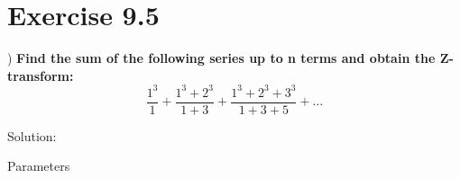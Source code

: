 \documentclass[journal,12pt,twocolumn]{article}
\begin{document}


\vspace{3cm}

\title{}
\author{EE23BTECH11217 - Prajwal M$^{*}$
}
\maketitle
\newpage
\bigskip

\renewcommand{\thefigure}{\theenumi}
\renewcommand{\thetable}{\theenumi}

\section*{Exercise 9.5}
) \hspace{2pt} \textbf{Find the sum of the following series up to n terms and obtain the Z-transform:}
$$ 
\frac{1^3}{1} + \frac{1^3 + 2^3}{1 + 3} + \frac{1^3 + 2^3 + 3^3}{1 + 3 + 5} + \ldots$$

\noindent Solution: 

\begin{table}[h]
    \centering
    
    \caption{Parameters}
    \label{tab: 11.9.5.25.1}
\end{table}
\end{document}
